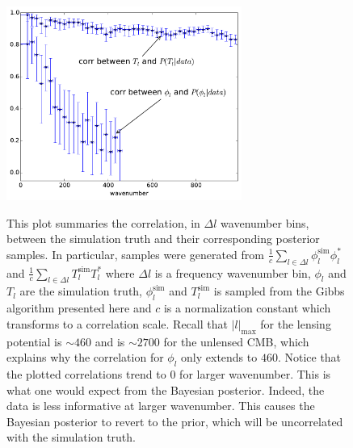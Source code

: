 \documentclass[iop,revtex4,apj,onecolumn]{emulateapj}
\begin{document}
\begin{figure}
\begin{center}
{\includegraphics[height=2.5in]{figure9a.pdf}}%
\end{center}
\caption{\label{t spec fig}
This plot summaries the correlation, in $\Delta l$ wavenumber bins, between the simulation truth and their corresponding posterior samples. In particular,
samples were generated from $\frac{1}{c}\sum_{l\in \Delta l} \phi^\text{sim}_l\phi^*_l $ and $\frac{1}{c}\sum_{l\in \Delta l} T^\text{sim}_lT^*_l $ where $\Delta l$ is a frequency wavenumber bin,  $\phi_l$ and $T_l$ are the simulation truth, $\phi^\text{sim}_l$  and $T^\text{sim}_l$  is sampled from the Gibbs algorithm presented here and $c$ is a normalization constant which transforms to a correlation scale.  Recall that $|l|_\text{max}$ for the lensing potential is $\sim460$ and is $\sim2700$ for the unlensed CMB, which explains why the correlation for $\phi_l$ only extends to $460$.
Notice that the plotted correlations trend to $0$ for larger wavenumber.
This is what one would expect from the Bayesian posterior. Indeed, the data is less informative at larger wavenumber. This causes the Bayesian posterior to revert to the prior, which will be uncorrelated with the simulation truth. 
}
\end{figure}
\end{document}
